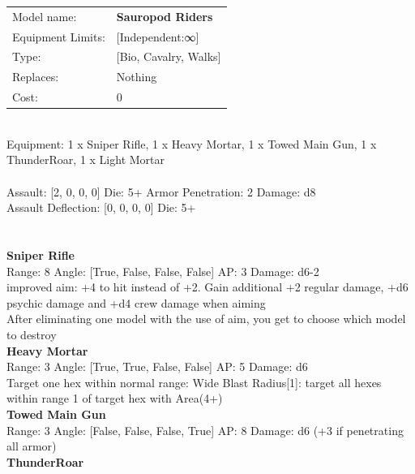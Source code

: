 \noindent
\begin{tabular}{ll}
Model name: &{\bf Sauropod Riders } \\
Equipment Limits: &[Independent:∞] \\
Type: &[Bio, Cavalry, Walks] \\
Replaces: &Nothing \\
Cost: & 0\\
\end{tabular}
\ \\
Equipment: 1 x Sniper Rifle, 1 x Heavy Mortar, 1 x Towed Main Gun, 1 x ThunderRoar, 1 x Light Mortar \\
\ \\
Assault: [2, 0, 0, 0] Die: 5+ Armor Penetration: 2 Damage: d8 \\
Assault Deflection: [0, 0, 0, 0] Die: 5+\\
\indent  
\ \\

\ \\
{\bf Sniper Rifle } \\



Range: 8  Angle: [True, False, False, False] AP: 3 Damage: d6-2 \\
improved aim: +4 to hit instead of +2. Gain additional +2 regular damage, +d6 psychic damage and +d4 crew damage when aiming\\ 
After eliminating one model with the use of aim, you get to choose which model to destroy\\ 




{\bf Heavy Mortar } \\



Range: 3  Angle: [True, True, False, False] AP: 5 Damage: d6 \\
Target one hex within normal range: Wide Blast Radius[1]: target all hexes within range 1 of target hex with Area(4+)\\ 




{\bf Towed Main Gun } \\



Range: 3  Angle: [False, False, False, True] AP: 8 Damage: d6 (+3 if penetrating all armor) \\




{\bf ThunderRoar } \\



